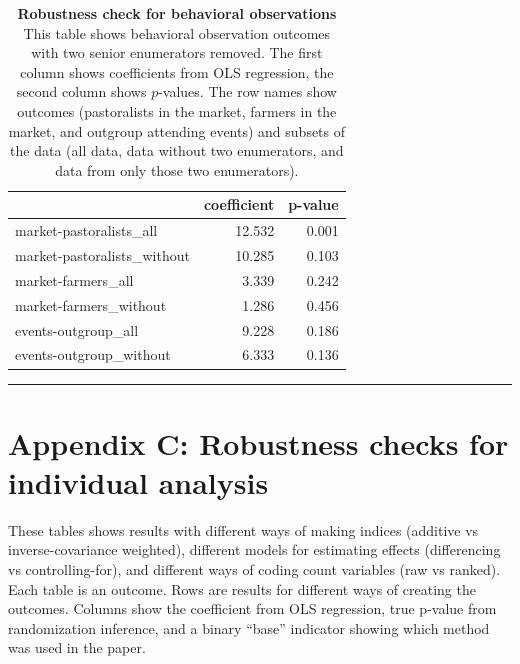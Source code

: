 \documentclass[
]{article}
\begin{document}
\begin{table}[H]
\begin{center}
\label{tab:behObs_enumsCheck_tab}
\caption{\textbf{Robustness check for behavioral observations} This table shows behavioral observation outcomes with two senior enumerators removed. The first column shows coefficients from OLS regression, the second column shows $p$-values. The row names show outcomes (pastoralists in the market, farmers in the market, and outgroup attending events) and subsets of the data (all data, data without two enumerators, and data from only those two enumerators).}
\smallskip

\begin{tabular}{l|r|r}
\hline
  & coefficient & p-value\\
\hline
market-pastoralists\_all & 12.532 & 0.001\\
\hline
market-pastoralists\_without & 10.285 & 0.103\\
\hline
market-farmers\_all & 3.339 & 0.242\\
\hline
market-farmers\_without & 1.286 & 0.456\\
\hline
events-outgroup\_all & 9.228 & 0.186\\
\hline
events-outgroup\_without & 6.333 & 0.136\\
\hline
\end{tabular}


\end{center}
\end{table}

\begin{center}\rule{0.5\linewidth}{0.5pt}\end{center}

\newpage

\hypertarget{appendix-c-robustness-checks-for-individual-analysis}{%
\section{Appendix C: Robustness checks for individual
analysis}\label{appendix-c-robustness-checks-for-individual-analysis}}

These tables shows results with different ways of making indices
(additive vs inverse-covariance weighted), different models for
estimating effects (differencing vs controlling-for), and different ways
of coding count variables (raw vs ranked). Each table is an outcome.
Rows are results for different ways of creating the outcomes. Columns
show the coefficient from OLS regression, true p-value from
randomization inference, and a binary ``base'' indicator showing which
method was used in the paper.
\end{document}
